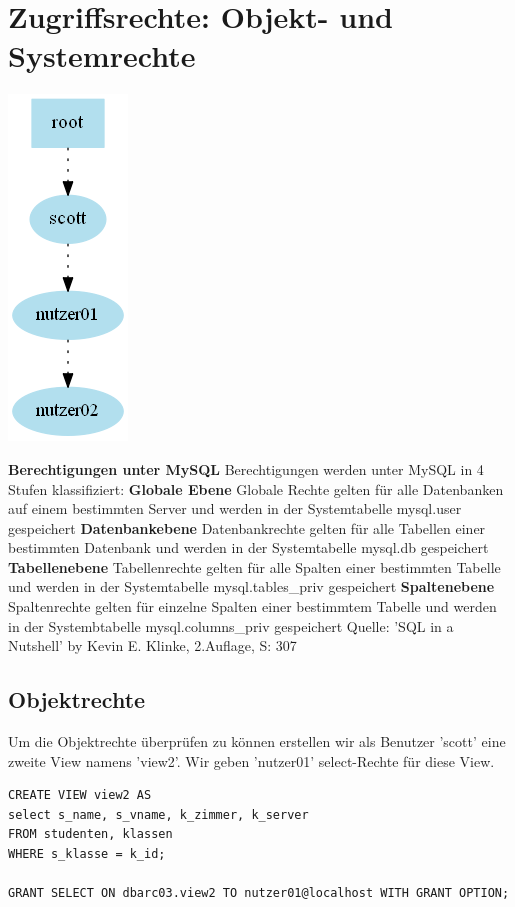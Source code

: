 \documentclass[10pt]{scrreprt}
\newcommand{\Bold}[1]{\textbf{#1}} %
\begin{document}
\section{Zugriffsrechte: Objekt- und Systemrechte}
\begin{center}
\includegraphics[scale=0.5]{MySQL_Dependency.png}
\end{center}
\Bold{Berechtigungen unter MySQL}\newline
Berechtigungen werden unter MySQL in 4 Stufen klassifiziert:\newline\newline
\Bold{Globale Ebene}\newline
Globale Rechte gelten für alle Datenbanken auf einem bestimmten Server und werden in der Systemtabelle mysql.user gespeichert\newline
\Bold{Datenbankebene}\newline
Datenbankrechte gelten für alle Tabellen einer bestimmten Datenbank und werden in der Systemtabelle mysql.db gespeichert\newline
\Bold{Tabellenebene}\newline
Tabellenrechte gelten für alle Spalten einer bestimmten Tabelle und werden in der Systemtabelle mysql.tables\_priv gespeichert\newline
\Bold{Spaltenebene}\newline
Spaltenrechte gelten für einzelne Spalten einer bestimmtem Tabelle und werden in der Systembtabelle mysql.columns\_priv gespeichert
\newline\newline\small{Quelle: 'SQL in a Nutshell' by Kevin E. Klinke, 2.Auflage, S: 307}
\subsection{Objektrechte}
Um die Objektrechte überprüfen zu können erstellen wir als Benutzer 'scott' eine zweite View namens 'view2'. Wir geben 'nutzer01' select-Rechte für diese View.
\begin{lstlisting}[style=sql]
CREATE VIEW view2 AS
select s_name, s_vname, k_zimmer, k_server
FROM studenten, klassen
WHERE s_klasse = k_id;

GRANT SELECT ON dbarc03.view2 TO nutzer01@localhost WITH GRANT OPTION;
\end{lstlisting}
\end{document}

